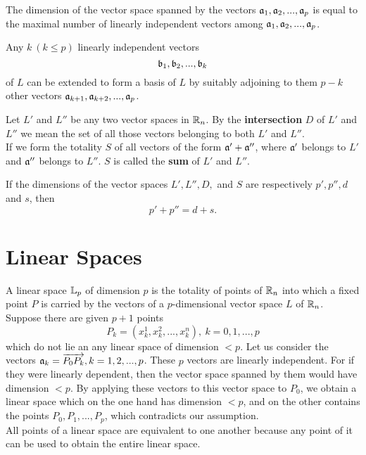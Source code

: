 \begin{theorem}
The dimension of the vector space spanned by the vectors $\mathfrak{a}_1, \mathfrak{a}_2, ...,\mathfrak{a}_p$ is equal to the maximal number of linearly independent vectors among $\mathfrak{a}_1, \mathfrak{a}_2, ..., \mathfrak{a}_p$.\label{Th2_5}
\end{theorem}

\begin{theorem}
Any $k ~ (k\le p)$ linearly independent vectors $$\mathfrak{b}_1, \mathfrak{b}_2, ..., \mathfrak{b}_k$$
 of $L$ can be extended to form a basis of $L$ by suitably adjoining to them $p-k$ other vectors $\mathfrak{a}_{k+1}, \mathfrak{a}_{k+2}, ..., \mathfrak{a}_p$.\label{Th2_6}
\end{theorem}

Let $L'$ and $L''$ be any two vector spaces in $\mathbb{R}_n$. By the {\bf intersection} $D$ of $L'$ and $L''$ we mean the set of all those vectors belonging to both $L'$ and $L''$.\\

If we form the totality $S$ of all vectors of the form $\mathfrak{a}' + \mathfrak{a}''$, where $\mathfrak{a}'$ belongs to $L'$ and $\mathfrak{a}''$ belongs to $L''$. $S$ is called the {\bf sum} of $L'$ and $L''$.

\begin{theorem}
If the dimensions of the vector spaces $L', L'', D,$ and $S$ are respectively $p', p'', d$ and $s$, then $$p' + p'' = d + s.$$\label{Th2_7}
\end{theorem}

\section{Linear Spaces}

A linear space $\mathbb{L}_p$ of dimension $p$ is the totality of points of $\mathbb{R}_n$ into which a fixed point $P$ is carried by the vectors of a $p$-dimensional vector space $L$ of $\mathbb{R}_n$. Suppose there are given $p+1$ points 
$$P_k = (x^1_k, x^2_k,...,x^n_k), ~k = 0, 1, ..., p$$ which do not lie an any linear space of dimension $<p$. Let us consider the vectors $\mathfrak{a}_k = \overrightarrow{P_0 P_k}, k = 1, 2, ...,p$. These $p$ vectors are linearly independent.
For if they were linearly dependent, then the vector space spanned by them would have dimension $<p$. By applying these vectors to this vector space to $P_0$, we obtain a linear space which on the one hand has dimension $<p$, and on
the other contains the points $P_0, P_1, ..., P_p$, which contradicts our assumption.\\

All points of a linear space are equivalent to one another because any point of it can be used to obtain the entire linear space. 

